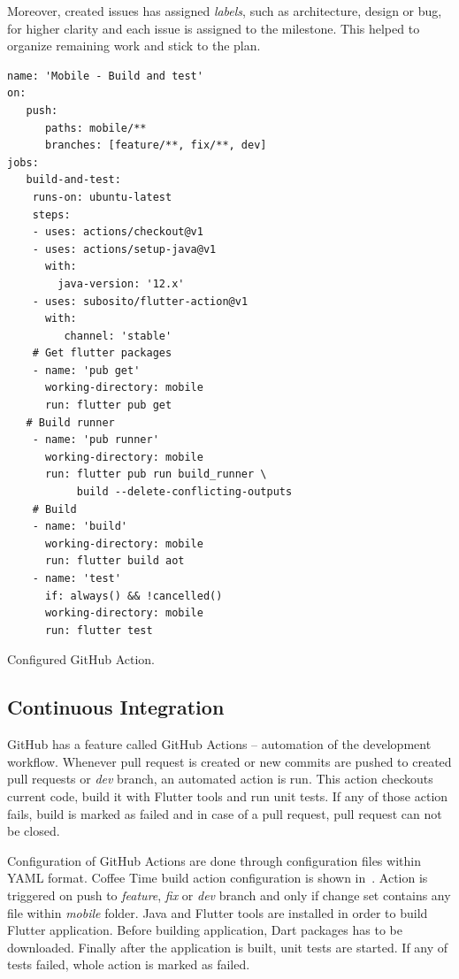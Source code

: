 Moreover, created issues has assigned \textit{labels}, such as architecture, design or bug, for higher clarity and each issue is assigned to the milestone. This helped to organize remaining work and stick to the plan. 

\begin{listing}[ht]
\begin{verbatim}
name: 'Mobile - Build and test'
on:
   push:
      paths: mobile/**
      branches: [feature/**, fix/**, dev]
jobs:
   build-and-test: 
    runs-on: ubuntu-latest
    steps:
    - uses: actions/checkout@v1 
    - uses: actions/setup-java@v1
      with:
        java-version: '12.x'
    - uses: subosito/flutter-action@v1
      with:
         channel: 'stable'
    # Get flutter packages
    - name: 'pub get'
      working-directory: mobile
      run: flutter pub get
   # Build runner
    - name: 'pub runner'
      working-directory: mobile
      run: flutter pub run build_runner \ 
           build --delete-conflicting-outputs
    # Build
    - name: 'build'
      working-directory: mobile
      run: flutter build aot
    - name: 'test'
      if: always() && !cancelled()
      working-directory: mobile
      run: flutter test
\end{verbatim}
\caption{Configured GitHub Action.}
\label{listing:gh-ci}
\end{listing}

\subsection{Continuous Integration}

GitHub has a feature called GitHub Actions -- automation of the development workflow. Whenever pull request is created or new commits are pushed to created pull requests or \textit{dev} branch, an automated action is run. This action checkouts current code, build it with Flutter tools and run unit tests. If any of those action fails, build is marked as failed and in case of a pull request, pull request can not be closed. 

Configuration of GitHub Actions are done through configuration files within YAML format. Coffee Time build action configuration is shown in~. Action is triggered on push to \textit{feature}, \textit{fix} or \textit{dev} branch and only if change set contains any file within \textit{mobile} folder. Java and Flutter tools are installed in order to build Flutter application. Before building application, Dart packages has to be downloaded. Finally after the application is built, unit tests are started. If any of tests failed, whole action is marked as failed.

